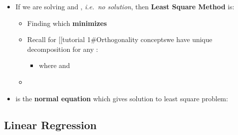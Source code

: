 \begin{itemize}

\item
  If we are solving  and
  , \emph{i.e.~no solution},
  then \textbf{Least Square Method} is:

  \begin{itemize}
  
  \item
    Finding  which \textbf{minimizes}
  \item
    Recall for  {[}{[}tutorial
    1\#Orthogonality concepts\textbar we have unique decomposition for
    any \iMbox{\mathbf{b} \in \mathbb{R}^{m}}{]}{]}:

    \begin{itemize}
    
    \item
      where  and
    \end{itemize}
  \item
  \end{itemize}
\item
   is the \textbf{normal
  equation} which gives solution to least square problem:
\end{itemize}

\subsection*{Linear Regression}

